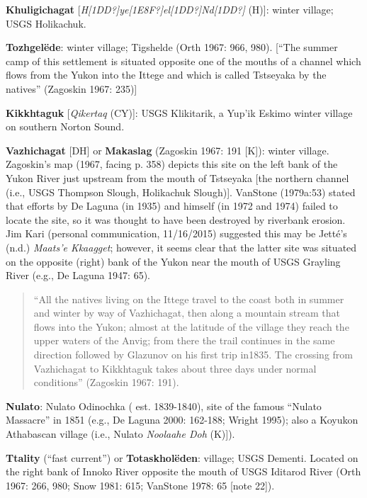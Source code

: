 \begin{hang}
\textbf{Khuligichagat} [\textit{H[1DD?]ye[1E8F?]el[1DD?]Nd[1DD?]} (H)]: winter village; USGS Holikachuk.



\textbf{Tozhgelëde}: winter village; Tigshelde (Orth 1967: 966, 980). [“The summer camp of this settlement is situated opposite one of the mouths of a channel which flows from the Yukon into the Ittege and which is called Tstseyaka by the natives” (Zagoskin 1967: 235)]



\textbf{Kikkhtaguk} [\textit{Qikertaq} (CY)]: USGS Klikitarik, a Yup’ik Eskimo winter village on southern Norton Sound.



\textbf{Vazhichagat} [DH] or \textbf{Makaslag} (Zagoskin 1967: 191 [K]): winter village. Zagoskin’s map (1967, facing p. 358) depicts this site on the left bank of the Yukon River just upstream from the mouth of Tstseyaka [the northern channel (i.e., USGS Thompson Slough, Holikachuk Slough)]. VanStone (1979a:53) stated that efforts by De Laguna (in 1935) and himself (in 1972 and 1974) failed to locate the site, so it was thought to have been destroyed by riverbank erosion. Jim Kari (personal communication, 11/16/2015) suggested this may be Jetté’s (n.d.) \textit{Maats’e Kkaagget}; however, it seems clear that the latter site was situated on the opposite (right) bank of the Yukon near the mouth of USGS Grayling River (e.g., De Laguna 1947: 65).



\begin{quote}“All the natives living on the Ittege travel to the coast both in summer and winter by way of Vazhichagat, then along a mountain stream that flows into the Yukon; almost at the latitude of the village they reach the upper waters of the Anvig; from there the trail continues in the same direction followed by Glazunov on his first trip in1835. The crossing from Vazhichagat to Kikkhtaguk takes about three days under normal conditions” (Zagoskin 1967: 191).
\end{quote}



\textbf{Nulato}: Nulato Odinochka ( est. 1839-1840), site of the famous “Nulato Massacre” in 1851 (e.g., De Laguna 2000: 162-188; Wright 1995); also a Koyukon Athabascan village (i.e., Nulato \textit{Noolaahe Doh} (K)]).



\textbf{Ttality} (“fast current”) or \textbf{Totaskholëden}: village; USGS Dementi. Located on the right bank of Innoko River opposite the mouth of USGS Iditarod River (Orth 1967: 266, 980; Snow 1981: 615; VanStone 1978: 65 [note 22]).




\end{hang}
